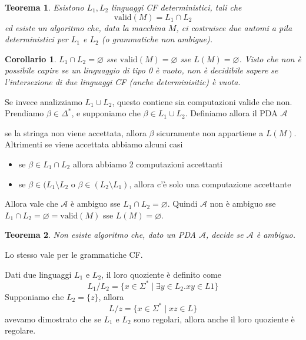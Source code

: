 \documentclass[12pt]{report}
\newtheorem{teorema}{Teorema}
\newtheorem{corollario}{Corollario}
\theoremstyle{definition}
\begin{document}
\begin{teorema}
	Esistono $L_1, L_2$ linguaggi CF deterministici, tali che
	$$ \text{valid}(M) = L_1 \cap L_2 $$
	ed esiste un algoritmo che, data la macchina $M$, ci costruisce due automi a pila deterministici per $L_1$ e $L_2$ (o grammatiche non ambigue).
\end{teorema}
\begin{corollario}
$L_1 \cap L_2 = \varnothing$ sse $\text{valid}(M) = \varnothing$ sse $L(M) = \varnothing$.
Visto che non è possibile capire se un linguaggio di tipo 0 è vuoto, non è decidibile sapere se l'intersezione di due linguaggi CF (anche determinisitic) è vuota.
\end{corollario}

Se invece analizziamo $L_1 \cup L_2$, questo contiene sia computazioni valide che non.
Prendiamo $\beta \in \Delta^*$, e supponiamo che $\beta \in L_1 \cup L_2$.
Definiamo allora il PDA $\mathcal{A}$
\begin{center}
\end{center}
se la stringa non viene accettata, allora $\beta$ sicuramente non appartiene a $L(M)$.
Altrimenti se viene accettata abbiamo alcuni casi
\begin{itemize}
	\item se $\beta \in L_1 \cap L_2$ allora abbiamo 2 computazioni accettanti
	\item se $\beta \in (L_1 \setminus L_2$ o $\beta \in (L_2 \setminus L_1)$, allora c'è solo una computazione accettante
\end{itemize}
Allora vale che $\mathcal{A}$ è ambiguo sse $L_1 \cap L_2 = \varnothing$.
Quindi $\mathcal{A}$ non è ambiguo sse $L_1 \cap L_2 = \varnothing = \text{valid}(M)$ sse $L(M) = \varnothing$.
\begin{teorema}
	Non esiste algoritmo che, dato un PDA $\mathcal{A}$, decide se $\mathcal{A}$ è ambiguo.
\end{teorema}
Lo stesso vale per le grammatiche CF.

Dati due linguaggi $L_1$ e $L_2$, il loro quoziente è definito come
$$ L_1 / L_2 = \{ x \in \Sigma^* \mid \exists y \in L_2 . xy \in L1 \} $$
Supponiamo che $L_2 = \{ z \}$, allora
$$ L / z = \{ x \in \Sigma^* \mid xz \in L \} $$
avevamo dimostrato che se $L_1$ e $L_2$ sono regolari, allora anche il loro quoziente è regolare.
\end{document}
